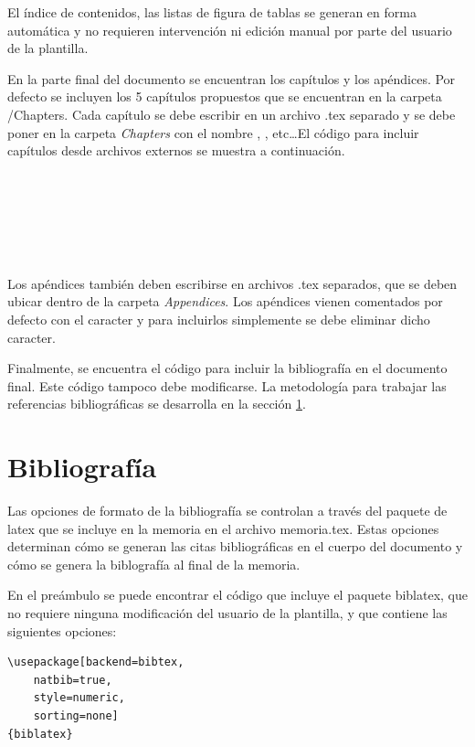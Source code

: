 El índice de contenidos, las listas de figura de tablas se generan en forma automática y no requieren intervención ni edición manual por parte del usuario de la plantilla. 

En la parte final del documento se encuentran los capítulos y los apéndices.  Por defecto se incluyen los 5 capítulos propuestos que se encuentran en la carpeta /Chapters. Cada capítulo se debe escribir en un archivo .tex separado y se debe poner en la carpeta \emph{Chapters} con el nombre , , etc\ldots El código para incluir capítulos desde archivos externos se muestra a continuación.

\begin{verbatim}
	
	 
	
	 
	 
\end{verbatim}

Los apéndices también deben escribirse en archivos .tex separados, que se deben ubicar dentro de la carpeta \emph{Appendices}. Los apéndices vienen comentados por defecto con el caracter \code{\%} y para incluirlos simplemente se debe eliminar dicho caracter.

Finalmente, se encuentra el código para incluir la bibliografía en el documento final.  Este código tampoco debe modificarse. La metodología para trabajar las referencias bibliográficas se desarrolla en la sección \ref{sec:biblio}.

\section{Bibliografía}
\label{sec:biblio}

Las opciones de formato de la bibliografía se controlan a través del paquete de latex  que se incluye en la memoria en el archivo memoria.tex.  Estas opciones determinan cómo se generan las citas bibliográficas en el cuerpo del documento y cómo se genera la biblografía al final de la memoria.

En el preámbulo se puede encontrar el código que incluye el paquete biblatex, que no requiere ninguna modificación del usuario de la plantilla, y que contiene las siguientes opciones:

\begin{lstlisting}
\usepackage[backend=bibtex,
	natbib=true, 
	style=numeric, 
	sorting=none]
{biblatex}
\end{lstlisting}

